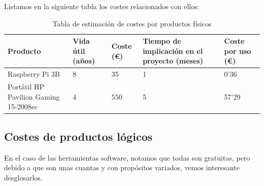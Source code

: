 Listamos en la siguiente tabla los costes relacionados con ellos:

\begin{center}
	\begin{table}[H]
		\centering
		\begin{tabularx}{\textwidth}{|X|X|X|X|X|}
			\hline
			{\cellcolor{lightblue}}\textbf{Producto} & 
			{\cellcolor{lightblue}}\textbf{Vida útil (años)} &  {\cellcolor{lightblue}}\textbf{Coste (€)} &
			{\cellcolor{lightblue}}\textbf{Tiempo de implicación en el proyecto (meses)} &
			{\cellcolor{lightblue}}\textbf{Coste por uso (€)} \\
			\hline
			Raspberry Pi 3B & 8 & 35 & 1 & 0'36\\
			\hline
			Portátil HP Pavilion Gaming 15-2008ec & 4 & 550 & 5 & 57'29\\
			\hline
		\end{tabularx}
		\caption{Tabla de estimación de costes por productos físicos}
	\end{table}
\end{center}
\vfill

\subsection{Costes de productos lógicos}
En el caso de las herramientas software, notamos que todas son gratuitas, pero debido a que son unas cuantas y con propósitos variados, vemos interesante desglosarlos.

